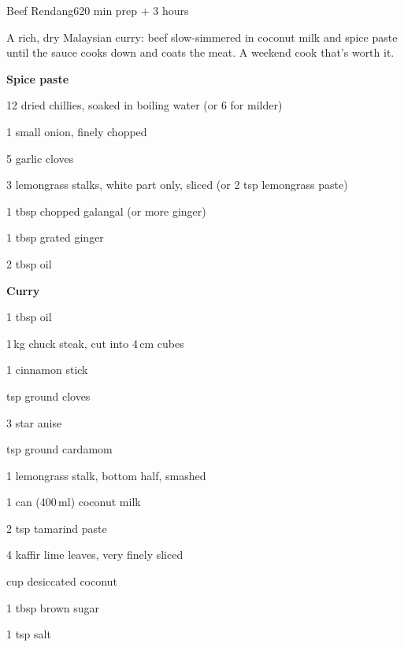 \begin{recipebox}{Beef Rendang}{6}{20 min prep + 3 hours}

A rich, dry Malaysian curry: beef slow-simmered in coconut milk and spice paste
until the sauce cooks down and coats the meat. A weekend cook that's worth it.

\begin{ingredients}
  \item[] \textbf{Spice paste}
  \item 12 dried chillies, soaked in boiling water (or 6 for milder)
  \item 1 small onion, finely chopped
  \item 5 garlic cloves
  \item 3 lemongrass stalks, white part only, sliced (or 2 tsp lemongrass paste)
  \item 1 tbsp chopped galangal (or more ginger)
  \item 1 tbsp grated ginger
  \item 2 tbsp oil
  \item[] \textbf{Curry}
  \item 1 tbsp oil
  \item 1\,kg chuck steak, cut into 4\,cm cubes
  \item 1 cinnamon stick
  \item {} tsp ground cloves
  \item 3 star anise
  \item {} tsp ground cardamom
  \item 1 lemongrass stalk, bottom half, smashed
  \item 1 can (400\,ml) coconut milk
  \item 2 tsp tamarind paste
  \item 4 kaffir lime leaves, very finely sliced
  \item {} cup desiccated coconut
  \item 1 tbsp brown sugar
  \item 1 tsp salt
\end{ingredients}


\end{recipebox}
